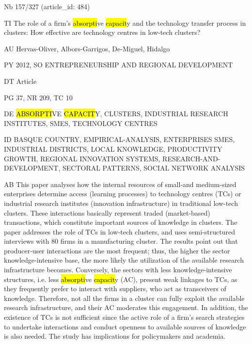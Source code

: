 \documentclass[a4paper]{article}
\begin{document}
\vspace*{-2cm}
Nb \tabto{0cm}157/327 (article\_id: 484)\par
TI \tabto{0cm}The role of a firm's \hl{absorpti}ve \hl{capacit}y and the technology transfer process in clusters: How effective are technology centres in low-tech clusters?\par
AU \tabto{0cm}Hervas-Oliver, Albors-Garrigos, De-Miguel, Hidalgo\par
PY \tabto{0cm}2012, SO ENTREPRENEURSHIP AND REGIONAL DEVELOPMENT\par
DT \tabto{0cm}Article\par
PG \tabto{0cm}37, NR 209, TC 10\par
DE \tabto{0cm}\hl{ABSORPTI}VE \hl{CAPACIT}Y, CLUSTERS, INDUSTRIAL RESEARCH INSTITUTES, SMES, TECHNOLOGY CENTRES\par
ID \tabto{0cm}BASQUE COUNTRY, EMPIRICAL-ANALYSIS, ENTERPRISES SMES, INDUSTRIAL DISTRICTS, LOCAL KNOWLEDGE, PRODUCTIVITY GROWTH, REGIONAL INNOVATION SYSTEMS, RESEARCH-AND-DEVELOPMENT, SECTORAL PATTERNS, SOCIAL NETWORK ANALYSIS\par
AB \tabto{0cm}This paper analyses how the internal resources of small-and medium-sized enterprises determine access (learning processes) to technology centres (TCs) or industrial research institutes (innovation infrastructure) in traditional low-tech clusters. These interactions basically represent traded (market-based) transactions, which constitute important sources of knowledge in clusters. The paper addresses the role of TCs in low-tech clusters, and uses semi-structured interviews with 80 firms in a manufacturing cluster. The results point out that producer-user interactions are the most frequent; thus, the higher the sector knowledge-intensive base, the more likely the utilization of the available research infrastructure becomes. Conversely, the sectors with less knowledge-intensive structures, i.e. less \hl{absorpti}ve \hl{capacit}y (AC), present weak linkages to TCs, as they frequently prefer to interact with suppliers, who act as transceivers of knowledge. Therefore, not all the firms in a cluster can fully exploit the available research infrastructure, and their AC moderates this engagement. In addition, the existence of TCs is not sufficient since the active role of a firm's search strategies to undertake interactions and conduct openness to available sources of knowledge is also needed. The study has implications for policymakers and academia.\par
\clearpage
\end{document}
